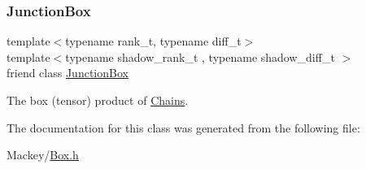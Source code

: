 \subsubsection{\texorpdfstring{Junction\+Box}{JunctionBox}}
{\footnotesize\ttfamily template$<$typename rank\+\_\+t, typename diff\+\_\+t$>$ \\
template$<$typename shadow\+\_\+rank\+\_\+t , typename shadow\+\_\+diff\+\_\+t $>$ \\
friend class \hyperlink{classMackey_1_1JunctionBox}{Junction\+Box}\hspace{0.3cm}{\ttfamily [friend]}}



The box (tensor) product of \hyperlink{classMackey_1_1Chains}{Chains}. 



The documentation for this class was generated from the following file\+:\begin{DoxyCompactItemize}
\item 
Mackey/\hyperlink{Box_8h}{Box.\+h}\end{DoxyCompactItemize}
